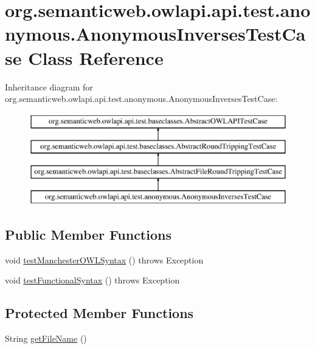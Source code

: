 \hypertarget{classorg_1_1semanticweb_1_1owlapi_1_1api_1_1test_1_1anonymous_1_1_anonymous_inverses_test_case}{\section{org.\-semanticweb.\-owlapi.\-api.\-test.\-anonymous.\-Anonymous\-Inverses\-Test\-Case Class Reference}
\label{classorg_1_1semanticweb_1_1owlapi_1_1api_1_1test_1_1anonymous_1_1_anonymous_inverses_test_case}
}
Inheritance diagram for org.\-semanticweb.\-owlapi.\-api.\-test.\-anonymous.\-Anonymous\-Inverses\-Test\-Case\-:\begin{figure}[H]
\begin{center}
\leavevmode
\includegraphics[height=4.000000cm]{classorg_1_1semanticweb_1_1owlapi_1_1api_1_1test_1_1anonymous_1_1_anonymous_inverses_test_case}
\end{center}
\end{figure}
\subsection*{Public Member Functions}
\begin{DoxyCompactItemize}
\item 
void \hyperlink{classorg_1_1semanticweb_1_1owlapi_1_1api_1_1test_1_1anonymous_1_1_anonymous_inverses_test_case_a987ebf88ea594a1226551cae61346326}{test\-Manchester\-O\-W\-L\-Syntax} ()  throws Exception 
\item 
void \hyperlink{classorg_1_1semanticweb_1_1owlapi_1_1api_1_1test_1_1anonymous_1_1_anonymous_inverses_test_case_a9468aec8e61696ca5801bddc6dc884aa}{test\-Functional\-Syntax} ()  throws Exception 
\end{DoxyCompactItemize}
\subsection*{Protected Member Functions}
\begin{DoxyCompactItemize}
\item 
String \hyperlink{classorg_1_1semanticweb_1_1owlapi_1_1api_1_1test_1_1anonymous_1_1_anonymous_inverses_test_case_af2626ffe90916f892c30ce9f0803ed45}{get\-File\-Name} ()
\end{DoxyCompactItemize}



